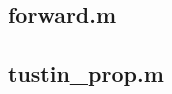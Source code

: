     \subsection*{forward.m}
    \label{subsec:forward}
    
    
    \subsection*{tustin\_prop.m}
    \label{subsec:tustin}
    